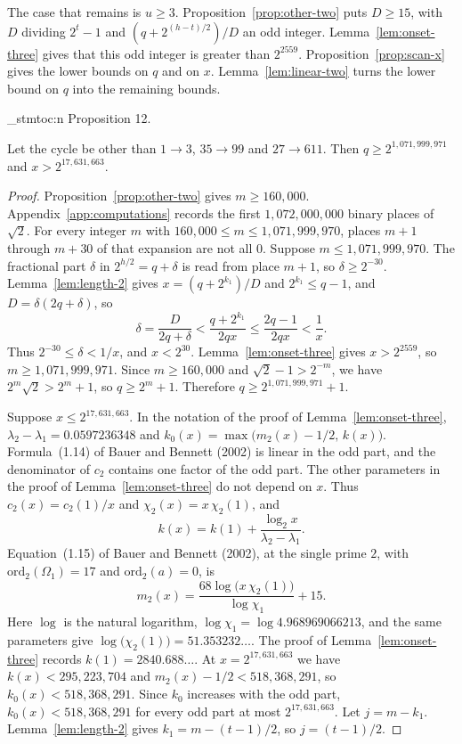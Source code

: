 \documentclass[11pt]{article}
\newenvironment{named}[1]{%
  \par\addvspace{\medskipamount}%
  \pagebreak[3]%
  \noindent{\bfseries #1}\space\ignorespaces
  \stmtoc{#1}%
}{\par\addvspace{\medskipamount}}
\newcommand{\stmtoc}[1]{ \qn_stmtoc:n {#1} }
\newcounter{lemmaref}
\newcommand{\marklemma}[2]{%
  \setcounter{lemmaref}{#1}%
  \addtocounter{lemmaref}{-1}%
  \refstepcounter{lemmaref}%
  \label{#2}%
}
\begin{document}
The case that remains is $u \ge 3$.
Proposition~\ref{prop:other-two} puts $D \ge 15$, with $D$ dividing $2^t - 1$ and $(q + 2^{(h - t)/2})/D$ an odd integer.
Lemma~\ref{lem:onset-three} gives that this odd integer is greater than $2^{2559}$.
Proposition~\ref{prop:scan-x} gives the lower bounds on $q$ and on $x$.
Lemma~\ref{lem:linear-two} turns the lower bound on $q$ into the remaining bounds.

\begin{named}{Proposition 12.}
\marklemma{12}{prop:scan-x}
Let the cycle be other than $1 \to 3$, $35 \to 99$ and $27 \to 611$.
Then $q \ge 2^{1{,}071{,}999{,}971}$ and $x > 2^{17{,}631{,}663}$.
\end{named}

\begin{proof}
Proposition~\ref{prop:other-two} gives $m \ge 160{,}000$.
Appendix~\ref{app:computations} records the first $1{,}072{,}000{,}000$ binary places of $\sqrt{2}$.
For every integer $m$ with $160{,}000 \le m \le 1{,}071{,}999{,}970$, places $m+1$ through $m+30$ of that expansion are not all $0$.
Suppose $m \le 1{,}071{,}999{,}970$.
The fractional part $\delta$ in $2^{h/2} = q + \delta$ is read from place $m+1$, so $\delta \ge 2^{-30}$.
Lemma~\ref{lem:length-2} gives $x = (q + 2^{k_1})/D$ and $2^{k_1} \le q - 1$, and $D = \delta(2q + \delta)$, so
\[
\delta = \frac{D}{2q + \delta} < \frac{q + 2^{k_1}}{2qx} \le \frac{2q - 1}{2qx} < \frac{1}{x}.
\]
Thus $2^{-30} \le \delta < 1/x$, and $x < 2^{30}$.
Lemma~\ref{lem:onset-three} gives $x > 2^{2559}$, so $m \ge 1{,}071{,}999{,}971$.
Since $m \ge 160{,}000$ and $\sqrt{2} - 1 > 2^{-m}$, we have $2^m \sqrt{2} > 2^m + 1$, so $q \ge 2^m + 1$.
Therefore $q \ge 2^{1{,}071{,}999{,}971} + 1$.

Suppose $x \le 2^{17{,}631{,}663}$.
In the notation of the proof of Lemma~\ref{lem:onset-three}, $\lambda_2 - \lambda_1 = 0.0597236348$ and $k_0(x) = \max\bigl(m_2(x) - 1/2,\, k(x)\bigr)$.
Formula~(1.14) of Bauer and Bennett (2002) is linear in the odd part, and the denominator of $c_2$ contains one factor of the odd part.
The other parameters in the proof of Lemma~\ref{lem:onset-three} do not depend on $x$.
Thus $c_2(x) = c_2(1)/x$ and $\chi_2(x) = x\, \chi_2(1)$, and
\[
k(x) = k(1) + \frac{\log_2 x}{\lambda_2 - \lambda_1}.
\]
Equation~(1.15) of Bauer and Bennett (2002), at the single prime $2$, with $\mathrm{ord}_2(\Omega_1) = 17$ and $\mathrm{ord}_2(a) = 0$, is
\[
m_2(x) = \frac{68 \log\bigl(x\, \chi_2(1)\bigr)}{\log \chi_1} + 15.
\]
Here $\log$ is the natural logarithm, $\log \chi_1 = \log 4.968969066213$, and the same parameters give $\log\bigl(\chi_2(1)\bigr) = 51.353232\ldots$.
The proof of Lemma~\ref{lem:onset-three} records $k(1) = 2840.688\ldots$.
At $x = 2^{17{,}631{,}663}$ we have $k(x) < 295{,}223{,}704$ and $m_2(x) - 1/2 < 518{,}368{,}291$, so $k_0(x) < 518{,}368{,}291$.
Since $k_0$ increases with the odd part, $k_0(x) < 518{,}368{,}291$ for every odd part at most $2^{17{,}631{,}663}$.
Let $j = m - k_1$.
Lemma~\ref{lem:length-2} gives $k_1 = m - (t - 1)/2$, so $j = (t - 1)/2$.


\end{proof}
\end{document}

